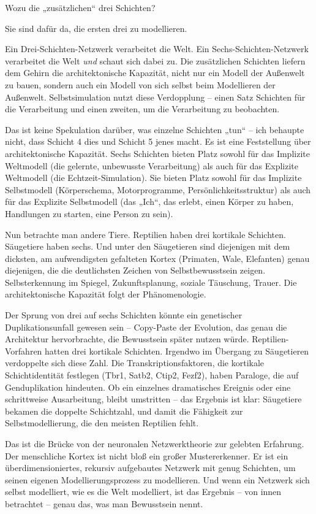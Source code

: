 \documentclass[11pt, twoside, openright]{book}
\begin{document}
Wozu die „zusätzlichen“ drei Schichten?

Sie sind dafür da, die ersten drei zu modellieren.

Ein Drei-Schichten-Netzwerk verarbeitet die Welt. Ein Sechs-Schichten-Netzwerk verarbeitet die Welt \textit{und} schaut sich dabei zu. Die zusätzlichen Schichten liefern dem Gehirn die architektonische Kapazität, nicht nur ein Modell der Außenwelt zu bauen, sondern auch ein Modell von sich selbst beim Modellieren der Außenwelt. Selbstsimulation nutzt diese Verdopplung -- einen Satz Schichten für die Verarbeitung und einen zweiten, um die Verarbeitung zu beobachten.

Das ist keine Spekulation darüber, was einzelne Schichten „tun“ -- ich behaupte nicht, dass Schicht 4 dies und Schicht 5 jenes macht. Es ist eine Feststellung über architektonische Kapazität. Sechs Schichten bieten Platz sowohl für das Implizite Weltmodell (die gelernte, unbewusste Verarbeitung) als auch für das Explizite Weltmodell (die Echtzeit-Simulation). Sie bieten Platz sowohl für das Implizite Selbstmodell (Körperschema, Motorprogramme, Persönlichkeitsstruktur) als auch für das Explizite Selbstmodell (das „Ich“, das erlebt, einen Körper zu haben, Handlungen zu starten, eine Person zu sein).

Nun betrachte man andere Tiere. Reptilien haben drei kortikale Schichten. Säugetiere haben sechs. Und unter den Säugetieren sind diejenigen mit dem dicksten, am aufwendigsten gefalteten Kortex (Primaten, Wale, Elefanten) genau diejenigen, die die deutlichsten Zeichen von Selbstbewusstsein zeigen. Selbsterkennung im Spiegel, Zukunftsplanung, soziale Täuschung, Trauer. Die architektonische Kapazität folgt der Phänomenologie.

Der Sprung von drei auf sechs Schichten könnte ein genetischer Duplikationsunfall gewesen sein -- Copy-Paste der Evolution, das genau die Architektur hervorbrachte, die Bewusstsein später nutzen würde. Reptilien-Vorfahren hatten drei kortikale Schichten. Irgendwo im Übergang zu Säugetieren verdoppelte sich diese Zahl. Die Transkriptionsfaktoren, die kortikale Schichtidentität festlegen (Tbr1, Satb2, Ctip2, Fezf2), haben Paraloge, die auf Genduplikation hindeuten. Ob ein einzelnes dramatisches Ereignis oder eine schrittweise Ausarbeitung, bleibt umstritten -- das Ergebnis ist klar: Säugetiere bekamen die doppelte Schichtzahl, und damit die Fähigkeit zur Selbstmodellierung, die den meisten Reptilien fehlt.

Das ist die Brücke von der neuronalen Netzwerktheorie zur gelebten Erfahrung. Der menschliche Kortex ist nicht bloß ein großer Mustererkenner. Er ist ein überdimensioniertes, rekursiv aufgebautes Netzwerk mit genug Schichten, um seinen eigenen Modellierungsprozess zu modellieren. Und wenn ein Netzwerk sich selbst modelliert, wie es die Welt modelliert, ist das Ergebnis -- von innen betrachtet -- genau das, was man Bewusstsein nennt.
\end{document}
